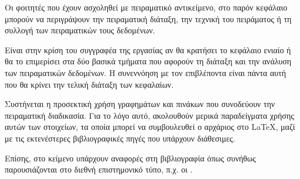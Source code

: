 Οι φοιτητές που έχουν ασχοληθεί με πειραματικό αντικείμενο, στο παρόν
κεφάλαιο μπορούν να περιγράψουν την πειραματική διάταξη, την τεχνική
του πειράματος ή τη συλλογή των πειραματικών τους δεδομένων.

Είναι στην κρίση του συγγραφέα της εργασίας αν θα κρατήσει το κεφάλαιο
ενιαίο ή θα το επιμερίσει στα δύο βασικά τμήματα που αφορούν τη
διάταξη και την ανάλυση των πειραματικών δεδομένων. Η συνεννόηση
με τον επιβλέποντα είναι πάντα αυτή που θα κρίνει την τελική διάταξη
των κεφαλαίων.

Συστήνεται η προσεκτική χρήση γραφημάτων και πινάκων που
συνοδεύουν την πειραματική διαδικασία. Για το λόγο αυτό, ακολουθούν
μερικά παραδείγματα χρήσης αυτών των στοιχείων, τα
οποία μπορεί να συμβουλευθεί ο αρχάριος στο \LaTeX, μαζί με
τις εκτενέστερες βιβλιογραφικές πηγές που υπάρχουν διάθεσιμες.

Επίσης, στο κείμενο υπάρχουν αναφορές στη βιβλιογραφία όπως συνήθως
παρουσιάζονται στο διεθνή επιστημονικό τύπο,
π.χ. οι \cite{2017_Khaliel,2011_AIP_Cl44}. 